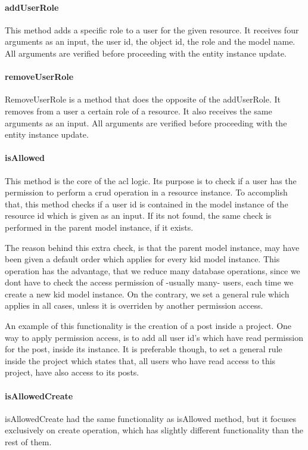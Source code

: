 \paragraph{addUserRole}
This method adds a specific role to a user for the given resource. It receives four arguments as an input, the user id, the object id, the role and the model name. All arguments are verified before proceeding with the entity instance update.
\paragraph{removeUserRole}
RemoveUserRole is a method that does the opposite of the addUserRole. It removes from a user a certain role of a resource. It also receives the same arguments as an input. All arguments are verified before proceeding with the entity instance update.
\paragraph{isAllowed}
This method is the core of the acl logic. Its purpose is to check if  a user has the permission to perform a crud operation in a resource instance. To accomplish that, this method checks if a user id is contained in the model instance of the resource id which is given as an input. If its not found, the same check is performed in the parent model instance, if it exists. \par 
	The reason behind this extra check, is that the parent model instance, may have been given a default order which applies for every kid model instance. This operation has the advantage, that we reduce many database operations, since we dont have to check the access permission of -usually many- users, each time we create a new kid model instance. On the contrary, we set a general rule which applies in all cases, unless it is overriden by another permission access. \par
	An example of this functionality is the creation of a post inside a project. One way to apply permission access, is to add all user id's which have read permission for the post, inside its instance. It is preferable though, to set a general rule inside the project which states that, all users who have read access to this project, have also access to its posts.

\paragraph{isAllowedCreate}
isAllowedCreate had the same functionality as isAllowed method, but it focuses exclusively on create operation, which has slightly different functionality than the rest of them.

